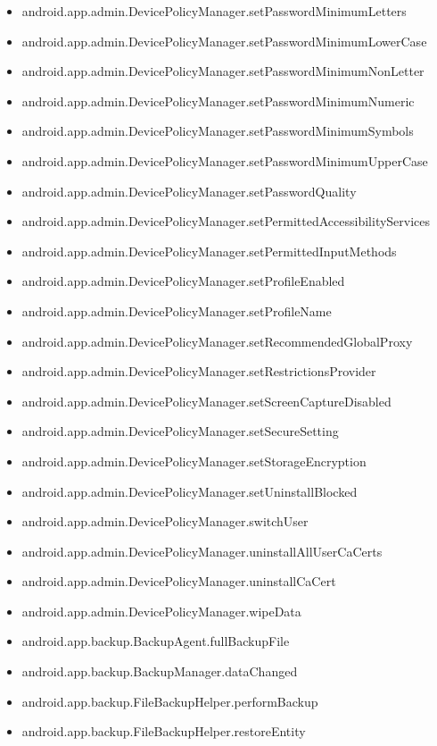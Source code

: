 \documentclass{sig-alternate}
\begin{document}
\begin{itemize}
\item android.app.admin.DevicePolicyManager.setPasswordMinimumLetters
\item android.app.admin.DevicePolicyManager.setPasswordMinimumLowerCase
\item android.app.admin.DevicePolicyManager.setPasswordMinimumNonLetter
\item android.app.admin.DevicePolicyManager.setPasswordMinimumNumeric
\item android.app.admin.DevicePolicyManager.setPasswordMinimumSymbols
\item android.app.admin.DevicePolicyManager.setPasswordMinimumUpperCase
\item android.app.admin.DevicePolicyManager.setPasswordQuality
\item android.app.admin.DevicePolicyManager.setPermittedAccessibilityServices
\item android.app.admin.DevicePolicyManager.setPermittedInputMethods
\item android.app.admin.DevicePolicyManager.setProfileEnabled
\item android.app.admin.DevicePolicyManager.setProfileName
\item android.app.admin.DevicePolicyManager.setRecommendedGlobalProxy
\item android.app.admin.DevicePolicyManager.setRestrictionsProvider
\item android.app.admin.DevicePolicyManager.setScreenCaptureDisabled
\item android.app.admin.DevicePolicyManager.setSecureSetting
\item android.app.admin.DevicePolicyManager.setStorageEncryption
\item android.app.admin.DevicePolicyManager.setUninstallBlocked
\item android.app.admin.DevicePolicyManager.switchUser
\item android.app.admin.DevicePolicyManager.uninstallAllUserCaCerts
\item android.app.admin.DevicePolicyManager.uninstallCaCert
\item android.app.admin.DevicePolicyManager.wipeData
\item android.app.backup.BackupAgent.fullBackupFile
\item android.app.backup.BackupManager.dataChanged
\item android.app.backup.FileBackupHelper.performBackup
\item android.app.backup.FileBackupHelper.restoreEntity

\end{itemize}
\end{document}
